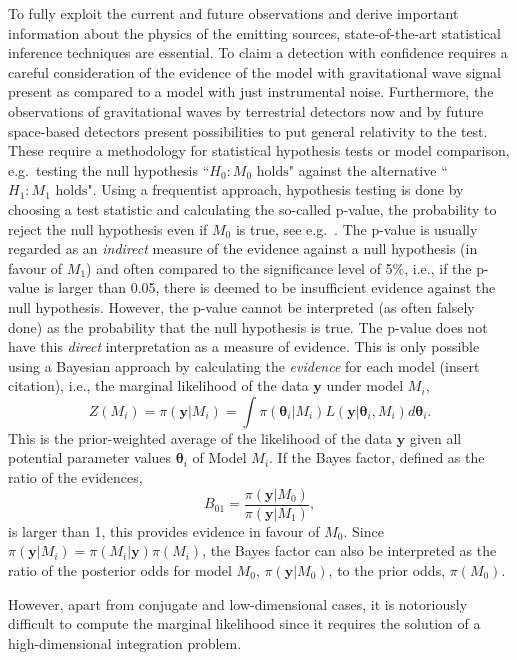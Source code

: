 \documentclass[%
 reprint,
 amsmath,amssymb,
 aps,
]{revtex4-2}
\def\btheta{\boldsymbol{\theta}}
\def\ybold{\mathbf{y}}
\begin{document}
To fully exploit the current and future observations and derive important information about the physics of the emitting sources, state-of-the-art statistical inference techniques are essential. To claim a detection with confidence requires a careful consideration of the evidence of the model with gravitational wave signal present as compared to a model with just instrumental noise. Furthermore, the observations of gravitational waves by terrestrial detectors now and by future space-based detectors present possibilities to put general relativity to the test. These require a methodology for statistical hypothesis tests or model comparison, e.g.\ testing the null hypothesis ``$H_0: M_0\mbox{ holds}$" against the alternative ``$H_1: M_1 \mbox{ holds}$".  Using a frequentist approach, hypothesis testing is done by
choosing a test statistic and calculating the so-called 
p-value, the probability to reject the null hypothesis even if $M_0$ is true, see e.g.\ \cite{alma9998701914002091}. The p-value is usually regarded as an {\em indirect} measure of
the evidence against a null hypothesis (in favour of $M_1$) and often compared to the significance level of 5\%, i.e., if the p-value is larger 
than 0.05, there is deemed to be insufficient evidence against the null hypothesis. However, the p-value cannot be interpreted (as often falsely done) as the probability that the null hypothesis is true. The p-value does not have this {\em direct} interpretation as a measure of evidence. This is only possible using a Bayesian approach by calculating the {\em evidence} for each model (insert citation), i.e., the marginal likelihood of the data $\ybold$ under model $M_i$, \[Z(M_i)=\pi(\ybold|M_i)=\int \pi(\btheta
_i|M_i)L(\ybold|\btheta_i,M_i)d\btheta_i.\]
This is the prior-weighted average of the likelihood of the data $\ybold$ given all potential parameter values $\btheta_i$ of Model $M_i$. 
If the Bayes factor, defined as the ratio of the evidences,
\[ B_{01}=\frac{\pi(\ybold|M_0)}{\pi(\ybold|M_1)},\]
is larger than 1, this provides evidence in favour of $M_0$. Since $\pi(\ybold|M_i)=\pi(M_i|\ybold)\pi(M_i)$,
the Bayes factor can also be interpreted as the ratio of the posterior odds for model $M_0$, $\pi(\ybold|M_0)$, to the prior odds, $\pi(M_0)$. 

However, apart from conjugate and low-dimensional cases, it is notoriously difficult to compute the marginal likelihood since it requires the solution of a high-dimensional integration problem.
\end{document}
